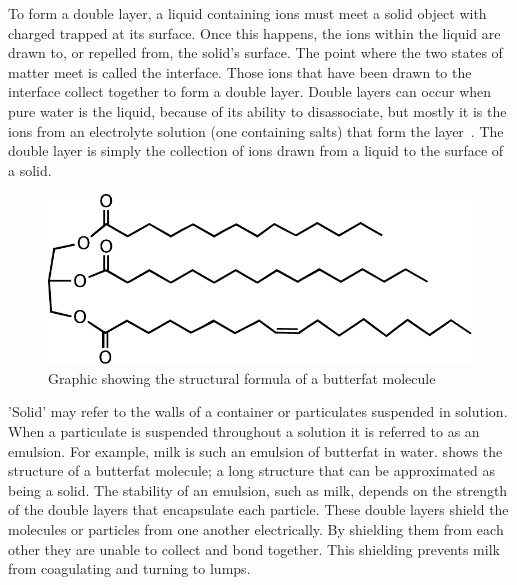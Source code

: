     To form a double layer, a liquid containing ions must meet a solid object with charged trapped at its surface.
    Once this happens, the ions within the liquid are drawn to, or repelled from, the solid's surface.
    The point where the two states of matter meet is called the interface.
    Those ions that have been drawn to the interface collect together to form a double layer.
    Double layers can occur when pure water is the liquid, because of its ability to disassociate, but mostly it is the ions from an electrolyte solution (one containing salts) that form the layer~\cite{Bruesch2004}.
    The double layer is simply the collection of ions drawn from a liquid to the surface of a solid.


    \begin{figure}
        \begin{center}
            \includegraphics[scale=0.8]{content/introduction/graphics/butterfat}
        \end{center}
        \caption{Graphic showing the structural formula of a butterfat molecule}
        \label{fig:butterfat}
    \end{figure}
    'Solid' may refer to the walls of a container or particulates suspended in solution.
    When a particulate is suspended throughout a solution it is referred to as an emulsion.
    For example, milk is such an emulsion of butterfat in water.
     shows the structure of a butterfat molecule; a long structure that can be approximated as being a solid.
    The stability of an emulsion, such as milk, depends on the strength of the double layers that encapsulate each particle.
    These double layers shield the molecules or particles from one another electrically.
    By shielding them from each other they are unable to collect and bond together.
    This shielding prevents milk from coagulating and turning to lumps.


